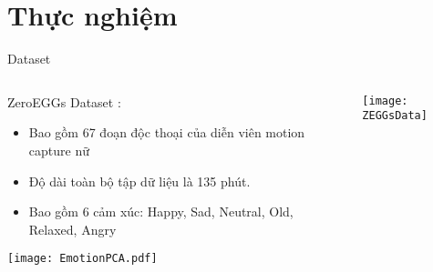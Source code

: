 
\section{Thực nghiệm}

\begin{frame}{Dataset}
	

\begin{columns}
	\begin{column}{0.6\textwidth}
		ZeroEGGs Dataset \cite{ghorbani2023zeroeggs}:
		
		\begin{itemize}
			\item Bao gồm 67 đoạn độc thoại của diễn viên motion capture nữ
			\item Độ dài toàn bộ tập dữ liệu là 135 phút.
			\item Bao  gồm 6 cảm xúc: Happy,  Sad, Neutral, Old, Relaxed, Angry
		\end{itemize}
		\texttt{[image: EmotionPCA.pdf]}
	\end{column}
	
	\begin{column}{0.4\textwidth}
		\texttt{[image: ZEGGsData]}
	\end{column}
\end{columns}
\end{frame}



%	

